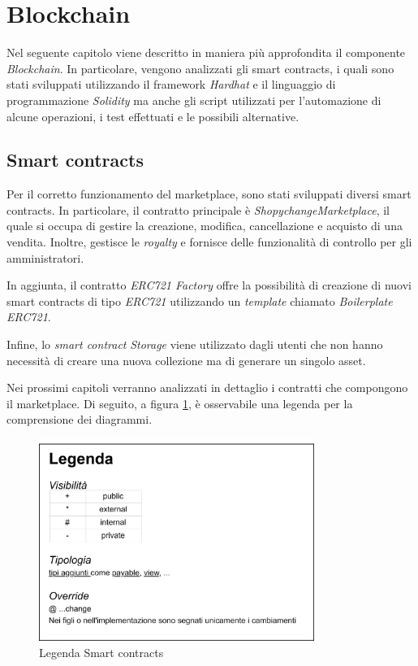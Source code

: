\section{Blockchain}
\label{sec:blockchain-module}

Nel seguente capitolo viene descritto in maniera più approfondita il componente \textit{Blockchain}. In particolare, vengono analizzati gli smart contracts, i quali sono stati sviluppati utilizzando il framework \textit{Hardhat} e il linguaggio di programmazione \textit{Solidity} ma anche gli script utilizzati per l'automazione di alcune operazioni, i test effettuati e le possibili alternative.

\subsection{Smart contracts}
\label{sec:smart-contract-shopychange}

Per il corretto funzionamento del marketplace, sono stati sviluppati diversi smart contracts. In particolare, il contratto principale è \textit{ShopychangeMarketplace}, il quale si occupa di gestire la creazione, modifica, cancellazione e acquisto di una vendita. Inoltre, gestisce le \textit{royalty} e fornisce delle funzionalità di controllo per gli amministratori.

In aggiunta, il contratto \textit{ERC721 Factory} offre la possibilità di creazione di nuovi smart contracts di tipo \textit{ERC721} utilizzando un \textit{template} chiamato \textit{Boilerplate ERC721}. 

Infine, lo \textit{smart contract} \textit{Storage} viene utilizzato dagli utenti che non hanno necessità di creare una nuova collezione ma di generare un singolo asset.  

Nei prossimi capitoli verranno analizzati in dettaglio i contratti che compongono il marketplace. Di seguito, a figura \ref{fig:legenda}, è osservabile una legenda per la comprensione dei diagrammi.
\begin{figure}[H]
    \centering
    \includegraphics[width=0.8\textwidth]{images/blockchainContracts/LegendaBordo.png}
    \caption{Legenda Smart contracts}
    \label{fig:legenda}
\end{figure}

